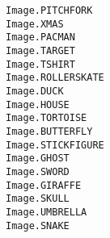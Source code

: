 \begin{multicols}{4}
	\texttt{Image.PITCHFORK}\\
	\texttt{Image.XMAS}\\
	\texttt{Image.PACMAN}\\
	\texttt{Image.TARGET}\\
	\texttt{Image.TSHIRT}\\
	\texttt{Image.ROLLERSKATE}\\
	\texttt{Image.DUCK}\\
	\texttt{Image.HOUSE}\\
	\texttt{Image.TORTOISE}\\
	\texttt{Image.BUTTERFLY}\\
	\texttt{Image.STICKFIGURE}\\
	\texttt{Image.GHOST}\\
	\texttt{Image.SWORD}\\
	\texttt{Image.GIRAFFE}\\
	\texttt{Image.SKULL}\\
	\texttt{Image.UMBRELLA}\\
	\texttt{Image.SNAKE}
\end{multicols}


